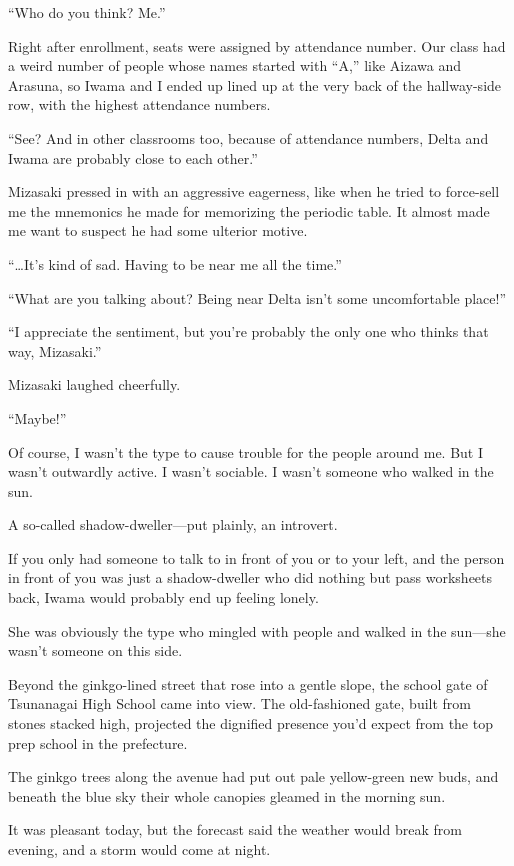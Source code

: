 \documentclass[
    a4paper,
    12pt,
    twoside,
    openany,
    UTF8,
    fontset=windows
]{ctexbook}
\begin{document}
``Who do you think? Me.''

Right after enrollment, seats were assigned by attendance number. Our class had a weird number of people whose names started with ``A,'' like Aizawa and Arasuna, so Iwama and I ended up lined up at the very back of the hallway-side row, with the highest attendance numbers.

``See? And in other classrooms too, because of attendance numbers, Delta and Iwama are probably close to each other.''

Mizasaki pressed in with an aggressive eagerness, like when he tried to force-sell me the mnemonics he made for memorizing the periodic table. It almost made me want to suspect he had some ulterior motive.

``\dots It's kind of sad. Having to be near me all the time.''

``What are you talking about? Being near Delta isn't some uncomfortable place!''

``I appreciate the sentiment, but you're probably the only one who thinks that way, Mizasaki.''

Mizasaki laughed cheerfully.

``Maybe!''

Of course, I wasn't the type to cause trouble for the people around me. But I wasn't outwardly active. I wasn't sociable. I wasn't someone who walked in the sun.

A so-called shadow-dweller---put plainly, an introvert.

If you only had someone to talk to in front of you or to your left, and the person in front of you was just a shadow-dweller who did nothing but pass worksheets back, Iwama would probably end up feeling lonely.

She was obviously the type who mingled with people and walked in the sun---she wasn't someone on this side.

Beyond the ginkgo-lined street that rose into a gentle slope, the school gate of Tsunanagai High School came into view. The old-fashioned gate, built from stones stacked high, projected the dignified presence you'd expect from the top prep school in the prefecture.

The ginkgo trees along the avenue had put out pale yellow-green new buds, and beneath the blue sky their whole canopies gleamed in the morning sun.

It was pleasant today, but the forecast said the weather would break from evening, and a storm would come at night.
\end{document}
